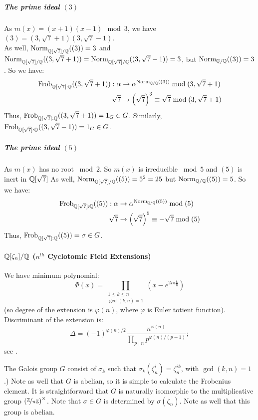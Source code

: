 \subparagraph{The prime ideal $(3)$}
As $m(x) = (x+1)(x-1) \mod 3$, we have $(3) = (3, \sqrt{7}+1)(3, \sqrt{7}-1)$.\\
As well, $\Norm[{\Q[\sqrt{7}]/\Q}]{(3)} = 3$ and $\Norm[{\Q[\sqrt{7}]/\Q}]{(3, \sqrt{7}+1)} 
=\Norm[{\Q[\sqrt{7}]/\Q}]{(3, \sqrt{7}-1)} 
= 3
$, but $\Norm[\Q/\Q]{(3)} = 3$.
So we have:
\begin{align*}
    \Frob{\Q[\sqrt{7}]:\Q}{(3, \sqrt{7}+1)}:
    \alpha   &\to \alpha^{\Norm[\Q/\Q]{(3)}} \bmod (3, \sqrt{7}+1)\\
    \sqrt{7} &\to \left( \sqrt{7} \right)^3 \equiv \sqrt{7} \bmod (3, \sqrt{7}+1)
\end{align*}
Thus, $\Frob{\Q[\sqrt{7}]:\Q}{(3, \sqrt{7}+1)} = 1_G \in G$.
Similarly, $\Frob{\Q[\sqrt{7}]:\Q}{(3, \sqrt{7}-1)} = 1_G \in G$.

\subparagraph{The prime ideal $(5)$}
As $m(x)$ has no root $\bmod 2$. So $m(x)$ is irreducible $\bmod 5$ and $(5)$ is inert in $\Q[\sqrt{7}]$
As well, $\Norm[{\Q[\sqrt{7}]/\Q}]{(5)} = 5^2 = 25$ but $\Norm[\Q/\Q]{(5)} = 5$.
So we have:
\begin{align*}
    \Frob{\Q[\sqrt{7}]:\Q}{(5)}: 
    \alpha   &\to \alpha^{\Norm[\Q/\Q]{(5)}} \bmod (5)\\
    \sqrt{7} &\to \left( \sqrt{7} \right)^5 \equiv -\sqrt{7} \bmod (5)
\end{align*}
Thus, $\Frob{\Q[\sqrt{7}]:\Q}{(5)} = \sigma \in G$.

\paragraph{$\Q[\zeta_n]/\Q$ ($n^{th}$ Cyclotomic Field Extensions)}
We have minimum polynomial:
$$
\Phi(x)= \prod_{\substack{1 \leq k \leq n \\ \gcd(k,n)=1}} 
\left( x-e^{2 i \pi \frac{k}{n}} \right)
$$
(so degree of the extension is $\varphi(n)$, where $\varphi$ is Euler totient function).
Discriminant of the extension is:
$$
\Delta = (-1)^{\varphi(n)/2}
\frac{n^{\varphi(n)}}{\prod_{p \mid n} p^{\varphi(n)/(p-1)}};
$$
see \cite[Proposition 2.7]{IntroductionToCyclotomicFields}.

The Galois group $G$ consist of $\sigma_k$ such that $\sigma_k(\zeta_n^i)=\zeta_n^{ik}$, with $\gcd(k,n)=1$.)
Note as well that $G$ is abelian, so it is simple to calculate the Frobenius element.
It is straightforward that $G$ is naturally isomorphic to the multiplicative group $\left( \nicefrac{\Z}{n\Z} \right)^\times$.
Note that $\sigma \in G$ is determined by $\sigma(\zeta_n)$.
Note as well that this group is abelian.

